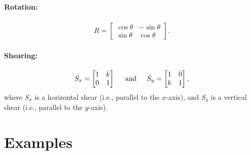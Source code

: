 \documentclass[12pt,letter]{article}
\begin{document}
\paragraph{Rotation:}

\begin{align}
	R = 
	\begin{bmatrix}
		\cos\theta & -\sin\theta \\
		\sin\theta &  \cos\theta 
	\end{bmatrix}.
\end{align}


\paragraph{Shearing:}

\begin{align}
	S_x = 
	\begin{bmatrix}
		1 & k \\
		0 &  1 
	\end{bmatrix} 
	\hspace{.2in}\text{and}\hspace{.2in}
	S_y = 
	\begin{bmatrix}
		1 & 0 \\
		k &  1 
	\end{bmatrix}, 
\end{align}
where \(S_x\) is a horizontal shear (i.e., parallel to the \(x\)-axis), and \(S_y\) is a vertical shear (i.e., parallel to the \(y\)-axis).

\section{Examples}
\label{examples}
\end{document}
